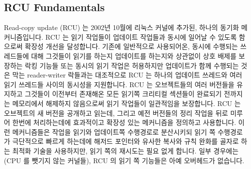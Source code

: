 
\subsection{RCU Fundamentals}
\label{sec:defer:RCU Fundamentals}

Read-copy update (RCU) 는 2002년 10월에 리눅스 커널에 추가된, 하나의 동기화
메커니즘입니다.
RCU 는 읽기 작업들이 업데이트 작업들과 동시에 일어날 수 있도록 함으로써 확장성
개선을 달성합니다.
기존에 일반적으로 사용되어온, 동시에 수행되는 쓰레드들에 대해 그것들이 읽기를
하는지 업데이트를 하는지와 상관없이 상호 배제를 보장하는 락킹 기능들 또는
동시의 읽기 작업은 허용하지만 업데이트가 함께 수행되는 것은 막는 reader-writer
락들과는 대조적으로 RCU 는 하나의 업데이트 쓰레드와 여러 읽기 쓰레드들 사이의
동시성을 지원합니다.
RCU 는 오브젝트들의 여러 버전들을 유지하고 그것들이 이전부터 존재해온 모든
읽기쪽 크리티컬 섹션들이 완료되기 전까지는 메모리에서 해제하지 않음으로써 읽기
작업들이 일관적임을 보장합니다.
RCU 는 오브젝트의 새 버전을 공개하고 읽는데, 그리고 예전 버전들의 정리 작업을
뒤로 미루어 한번에 처리하는데에 효과적이고 확장성 있는 메커니즘을 정의하고
사용합니다.
이런 메커니즘들은 작업을 읽기와 업데이트쪽 수행경로로 분산시키되 읽기 쪽
수행경로가 극단적으로 빠르게 하는데에 해저드 포인터와 유사한 복사와 규칙 완화를
골자로 하는 최적화 기술을 사용하지만, 읽기 쪽의 재시도는 필요 없게 합니다.
일부 경우에는 (CPU 를 뺏기지 않는 커널들), RCU 의 읽기 쪽 기능들은 아예
오버헤드가 없습니다.

